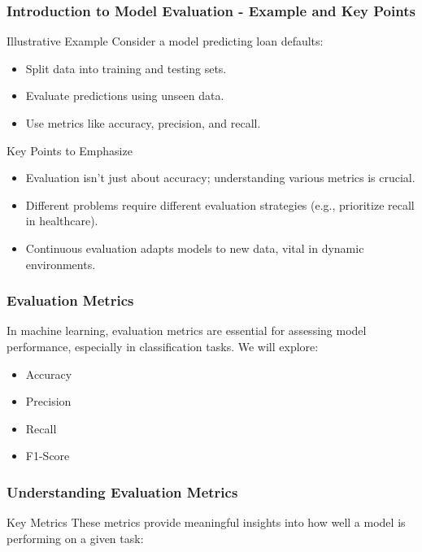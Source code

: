\documentclass[aspectratio=169]{beamer}
\begin{document}
\begin{frame}[fragile]
    \frametitle{Introduction to Model Evaluation - Example and Key Points}
    \begin{block}{Illustrative Example}
        Consider a model predicting loan defaults:
        \begin{itemize}
            \item Split data into training and testing sets.
            \item Evaluate predictions using unseen data.
            \item Use metrics like accuracy, precision, and recall.
        \end{itemize}
    \end{block}
    \begin{block}{Key Points to Emphasize}
        \begin{itemize}
            \item Evaluation isn't just about accuracy; understanding various metrics is crucial.
            \item Different problems require different evaluation strategies (e.g., prioritize recall in healthcare).
            \item Continuous evaluation adapts models to new data, vital in dynamic environments.
        \end{itemize}
    \end{block}
\end{frame}

\begin{frame}[fragile]
    \frametitle{Evaluation Metrics}
    In machine learning, evaluation metrics are essential for assessing model performance, especially in classification tasks. We will explore:
    \begin{itemize}
        \item Accuracy
        \item Precision
        \item Recall
        \item F1-Score
    \end{itemize}
\end{frame}

\begin{frame}[fragile]
    \frametitle{Understanding Evaluation Metrics}
    \begin{block}{Key Metrics}
        These metrics provide meaningful insights into how well a model is performing on a given task:
    \end{block}
\end{frame}
\end{document}
